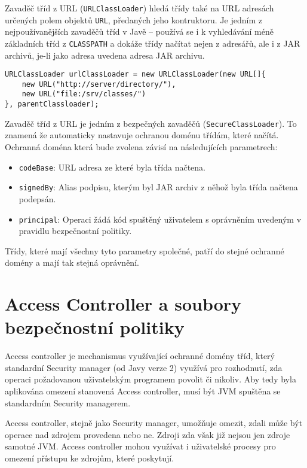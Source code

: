 Zavaděč tříd z URL ({\tt URLClassLoader}) hledá třídy také na URL adresách určených polem objektů {\tt URL}, předaných jeho kontruktoru. Je jedním z nejpoužívanějších zavaděčů tříd v Javě -- používá se i k vyhledávání méně základních tříd z {\tt CLASSPATH} a dokáže třídy načítat nejen z adresářů, ale i z JAR archivů, je-li jako adresa uvedena adresa JAR archivu. \cite[3.2.5]{oaks}

\begin{verbatim}
URLClassLoader urlClassLoader = new URLClassLoader(new URL[]{
    new URL("http://server/directory/"),
    new URL("file:/srv/classes/")
}, parentClassloader);
\end{verbatim}

Zavaděč tříd z URL je jedním z bezpečných zavaděčů ({\tt SecureClassLoader}). To znamená že automaticky nastavuje ochranou doménu třídám, které načítá.
Ochranná doména která bude zvolena závisí na následujících parametrech: \cite{refPolicyFiles}

\begin{itemize}
  \item {\tt codeBase}: URL adresa ze které byla třída načtena.
  \item {\tt signedBy}: Alias podpisu, kterým byl JAR archiv z něhož byla třída načtena podepsán.
  \item {\tt principal}: Operaci žádá kód spuštěný uživatelem s oprávněním uvedeným v pravidlu bezpečnostní politiky.
\end{itemize}

Třídy, které mají všechny tyto parametry společné, patří do stejné ochranné domény a mají tak stejná oprávnění.

\section{Access Controller a soubory bezpečnostní politiky}

Access controller je mechanismus využívající ochranné domény tříd, který standardní Security manager (od Javy verze 2) využívá pro rozhodnutí, zda operaci požadovanou uživatelským programem povolit či nikoliv. Aby tedy byla aplikována omezení stanovená Access controller, musí být JVM spuštěna se standardním Security managerem. \cite[5]{oaks}

Access controller, stejně jako Security manager, umožňuje omezit, zdali může být operace nad zdrojem provedena nebo ne. Zdroji zda však již nejsou jen zdroje samotné JVM. Access controller mohou využívat i uživatelské procesy pro omezení přístupu ke zdrojům, které poskytují. \cite[5]{oaks}

